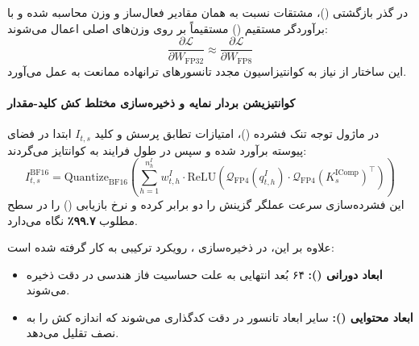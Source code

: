 در گذر بازگشتی ()، مشتقات نسبت به همان مقادیر فعال‌ساز و وزن  محاسبه شده و با برآوردگر مستقیم () مستقیماً بر روی وزن‌های اصلی  اعمال می‌شوند:
\begin{equation}
    \frac{\partial \mathcal{L}}{\partial W_{\text{FP32}}} \approx \frac{\partial \mathcal{L}}{\partial W_{\text{FP8}}}
\end{equation}
این ساختار از نیاز به کوانتیزاسیون مجدد تانسورهای ترانهاده ممانعت به عمل می‌آورد.

\paragraph*{کوانتیزیشن بردار نمایه و ذخیره‌سازی مختلط کش کلید-مقدار}
در ماژول توجه تنک فشرده ()، امتیازات تطابق پرسش و کلید $I_{t,s}$ ابتدا در فضای پیوسته  برآورد شده و سپس در طول فرایند  به  کوانتایز می‌گردند:
\begin{equation}
    I_{t,s}^{\text{BF16}} = \text{Quantize}_{\text{BF16}}\left( \sum_{h=1}^{n_h^I} w_{t,h}^I \cdot \text{ReLU}\left( \mathcal{Q}_{\text{FP4}}(q_{t,h}^I) \cdot \mathcal{Q}_{\text{FP4}}(K_s^{\text{IComp}})^\top \right) \right)
\end{equation}
این فشرده‌سازی سرعت عملگر گزینش  را دو برابر کرده و نرخ بازیابی () را در سطح مطلوب \textbf{۹۹.۷٪} نگاه می‌دارد.

علاوه بر این، در ذخیره‌سازی ، رویکرد ترکیبی به کار گرفته شده است:
\begin{itemize}
    \item \textbf{ابعاد دورانی ():} ۶۴ بُعد انتهایی به علت حساسیت فاز هندسی در دقت  ذخیره می‌شوند.
    \item \textbf{ابعاد محتوایی ():} سایر ابعاد تانسور در دقت  کدگذاری می‌شوند که اندازه کش را به نصف تقلیل می‌دهد.
\end{itemize}

